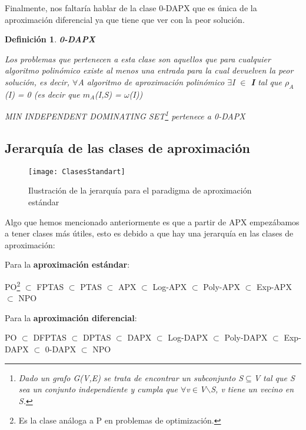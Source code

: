 \documentclass[a4paper,12pt,titlepage]{article}
\newtheorem{defi}{Definici\'on}[section]
\begin{document}
Finalmente, nos faltar\'ia hablar de la clase 0-DAPX que es \'unica de la aproximaci\'on diferencial ya que tiene que ver con la peor soluci\'on.

\begin{defi}

\textbf{0-DAPX}

Los problemas que pertenecen a esta clase son aquellos que para cualquier algoritmo polin\'omico existe al menos una entrada para la cual devuelven la peor soluci\'on, es decir, $\forall$A algoritmo de aproximaci\'on polin\'omico $\exists$I $\in$ \textbf{I} tal que $\rho_{A}$(I) = 0 (es decir que $m_A$(I,S) = $\omega$(I))

MIN INDEPENDENT DOMINATING SET\footnote{Dado un grafo G(V,E) se trata de encontrar un subconjunto S$\subseteq$V tal que S sea un conjunto independiente y cumpla que $\forall$v$\in$V$\backslash$S, v tiene un vecino en S.} pertenece a 0-DAPX

\end{defi}

\subsection{Jerarqu\'ia de las clases de aproximaci\'on}

\begin{figure}[h]
\centering
\texttt{[image: ClasesStandart]}
\caption{Ilustraci\'on de la jerarqu\'ia para el paradigma de aproximaci\'on est\'andar}
\end{figure}

Algo que hemos mencionado anteriormente es que a partir de APX empez\'abamos a tener clases m\'as \'utiles, esto es debido a que hay una jerarqu\'ia en las clases de aproximaci\'on:

\vspace{\baselineskip}

Para la \textbf{aproximaci\'on est\'andar}:

PO\footnote{Es la clase an\'aloga a P en problemas de optimizaci\'on.}  $\subset$ FPTAS $\subset$ PTAS $\subset$ APX $\subset$ Log-APX $\subset$ Poly-APX $\subset$ Exp-APX $\subset$ NPO

\vspace{\baselineskip}

Para la \textbf{aproximaci\'on diferencial}:

PO $\subset$ DFPTAS $\subset$ DPTAS $\subset$ DAPX $\subset$ Log-DAPX $\subset$ Poly-DAPX $\subset$ Exp-DAPX $\subset$ 0-DAPX $\subset$ NPO
\end{document}
